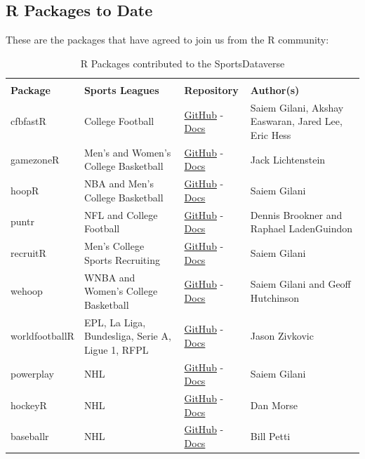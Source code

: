 \documentclass[12pt]{article}
\begin{document}
\subsection{R Packages to Date}
These are the packages that have agreed to join us from the R community:
\begin{table}[!htbp]
\centering
\renewcommand{\arraystretch}{1.3}
\begin{tabular}{>{\raggedright}m{1.0in} >{\raggedright}m{2.2in} >{\centering}m{0.8in} >{\raggedright\arraybackslash}m{2.0in}}
\toprule
\multicolumn{4}{c}{\textbf{R Packages in the SportsDataverse}} \\
\textbf{Package} & \textbf{Sports Leagues} & \textbf{Repository} & \textbf{Author(s)} \\ 
 \midrule
    cfbfastR & College Football & \href{https://github.com/saiemgilani/cfbfastR/}{GitHub} - \href{https://saiemgilani.github.io/cfbfastR/}{Docs} & Saiem Gilani, Akshay Easwaran, Jared Lee, Eric Hess \\
    gamezoneR  & Men's and Women's College Basketball & \href{https://github.com/jacklich10/gamezoneR/}{GitHub} - \href{https://jacklich10.github.io/gamezoneR/}{Docs} & Jack Lichtenstein \\
    hoopR & NBA and Men's College Basketball & \href{https://github.com/saiemgilani/hoopR/}{GitHub} - \href{https://hoopR.sportsdataverse.org}{Docs} & Saiem Gilani \\
    puntr & NFL and College Football & \href{https://github.com/Puntalytics/puntr}{GitHub} - \href{https://puntalytics.github.io/puntr/}{Docs} & Dennis Brookner and Raphael LadenGuindon \\
    recruitR & Men's College Sports Recruiting & \href{https://github.com/saiemgilani/recruitR/}{GitHub} - \href{https://saiemgilani.github.io/recruitR/}{Docs} & Saiem Gilani \\
    wehoop & WNBA and Women's College Basketball & \href{https://github.com/saiemgilani/wehoop}{GitHub} - \href{https://wehoop.sportsdataverse.org}{Docs} & Saiem Gilani and Geoff Hutchinson \\
    worldfootballR & EPL, La Liga, Bundesliga, Serie A, Ligue 1, RFPL & \href{https://github.com/JaseZiv/worldfootballR}{GitHub} - \href{https://jaseziv.github.io/worldfootballR}{Docs} & Jason Zivkovic \\
    powerplay & NHL & \href{https://github.com/saiemgilani/powerplay}{GitHub} - \href{https://saiemgilani.github.io/powerplay}{Docs} & Saiem Gilani \\
    hockeyR & NHL & \href{https://github.com/danmorse314/hockeyR/}{GitHub} - \href{https://hockeyr.netlify.app/}{Docs} & Dan Morse \\
    baseballr & NHL & \href{https://github.com/BillPetti/baseballr/}{GitHub} - \href{https://BillPetti.github.io/baseballr}{Docs} & Bill Petti \\
\bottomrule 
\end{tabular}
\vspace{5pt}
\caption{R Packages contributed to the SportsDataverse}
\label{tbl:sdvr}
\vspace{-5mm}
\end{table}
\end{document}
